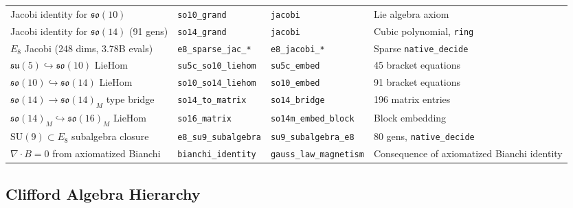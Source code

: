 \documentclass[aps,prd,twocolumn,showpacs,preprintnumbers,superscriptaddress,floatfix]{revtex4-2}
\newcommand{\so}{\mathfrak{so}}
\newcommand{\su}{\mathfrak{su}}
\begin{document}
\begin{table}[t]
\begin{tabular}{@{}llll@{}}
Jacobi identity for $\so(10)$ %
  & \texttt{so10\_grand} & \texttt{jacobi} & Lie algebra axiom \\
Jacobi identity for $\so(14)$ (91 gens) %
  & \texttt{so14\_grand} & \texttt{jacobi} & Cubic polynomial, \texttt{ring} \\
$E_8$ Jacobi (248 dims, 3.78B evals) %
  & \texttt{e8\_sparse\_jac\_*} & \texttt{e8\_jacobi\_*} & Sparse \texttt{native\_decide} \\
$\su(5) \hookrightarrow \so(10)$ LieHom %
  & \texttt{su5c\_so10\_liehom} & \texttt{su5c\_embed} & 45 bracket equations \\
$\so(10) \hookrightarrow \so(14)$ LieHom %
  & \texttt{so10\_so14\_liehom} & \texttt{so10\_embed} & 91 bracket equations \\
$\so(14) \to \so(14)_M$ type bridge %
  & \texttt{so14\_to\_matrix} & \texttt{so14\_bridge} & 196 matrix entries \\
$\so(14)_M \hookrightarrow \so(16)_M$ LieHom %
  & \texttt{so16\_matrix} & \texttt{so14m\_embed\_block} & Block embedding \\
$\mathrm{SU}(9) \subset E_8$ subalgebra closure %
  & \texttt{e8\_su9\_subalgebra} & \texttt{su9\_subalgebra\_e8} & 80 gens, \texttt{native\_decide} \\
$\nabla \cdot B = 0$ from axiomatized Bianchi %
  & \texttt{bianchi\_identity} & \texttt{gauss\_law\_magnetism} & Consequence of axiomatized Bianchi identity \\
\bottomrule
\end{tabular}
\end{table}

\subsection{Clifford Algebra Hierarchy}
\end{document}
